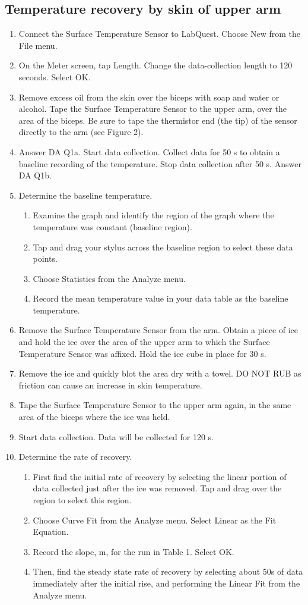 \documentclass[12pt,oneside]{article}
\begin{document}
\subsection{Temperature recovery by skin of upper arm}
\begin{enumerate}
\item	Connect the Surface Temperature Sensor to LabQuest. Choose New from the File menu.
\item	On the Meter screen, tap Length. Change the data-collection length to 120 seconds. Select OK.
\item	Remove excess oil from the skin over the biceps with soap and water or alcohol. Tape the Surface Temperature Sensor to the upper arm, over the area of the biceps. Be sure to tape the thermistor end (the tip) of the sensor directly to the arm (see Figure 2). 
\item	Answer DA Q1a. Start data collection. Collect data for 50 s to obtain a baseline recording of the temperature. Stop data collection after 50 s. Answer DA Q1b.
\item	Determine the baseline temperature.
\begin{enumerate}
\item	Examine the graph and identify the region of the graph where the temperature was constant (baseline region).
\item	Tap and drag your stylus across the baseline region to select these data points.
\item	Choose Statistics from the Analyze menu.
\item	Record the mean temperature value in your data table as the baseline temperature. 
\end{enumerate}
\item	Remove the Surface Temperature Sensor from the arm. Obtain a piece of ice and hold the ice over the area of the upper arm to which the Surface Temperature Sensor was affixed. Hold the ice cube in place for 30 s.
\item	Remove the ice and quickly blot the area dry with a towel. DO NOT RUB as friction can cause an increase in skin temperature. 
\item	Tape the Surface Temperature Sensor to the upper arm again, in the same area of the biceps where the ice was held. 
\item	Start data collection. Data will be collected for 120 s. 
\item	Determine the rate of recovery.
\begin{enumerate}
\item	First find the initial rate of recovery by selecting the linear portion of data collected just after the ice was removed. Tap and drag over the region to select this region. 
\item	Choose Curve Fit from the Analyze menu. Select Linear as the Fit Equation. 
\item	Record the slope, m, for the run in Table 1. Select OK.
\item	Then, find the steady state rate of recovery by selecting about 50s of data immediately after the initial rise, and performing the Linear Fit from the Analyze menu.
\end{enumerate}


\end{enumerate}
\end{document}

